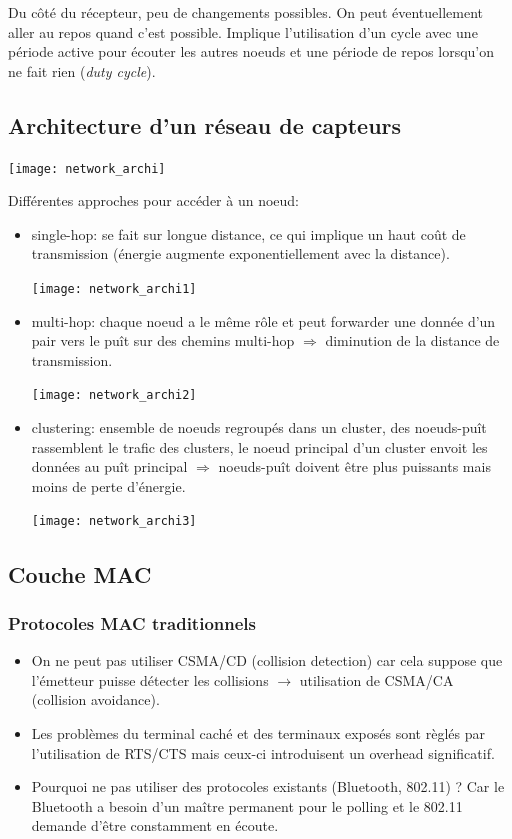 \documentclass{article}
\begin{document}
\begin{sffamily}
Du côté du récepteur, peu de changements possibles. On peut éventuellement
aller au repos quand c'est possible. Implique l'utilisation d'un cycle avec
une période active pour écouter les autres noeuds et une période de repos
lorsqu'on ne fait rien (\textit{duty cycle}).

\subsection{Architecture d'un réseau de capteurs}
\texttt{[image: network\_archi]}

Différentes approches pour accéder à un noeud:
\begin{itemize}
\item single-hop: se fait sur longue distance, ce qui implique un haut
  coût de transmission (énergie augmente exponentiellement avec la distance).

  \texttt{[image: network\_archi1]}
\item multi-hop: chaque noeud a le même rôle et peut forwarder une donnée
  d'un pair vers le puît sur des chemins multi-hop
  $\Rightarrow$ diminution de la distance de transmission.

  \texttt{[image: network\_archi2]}
\item clustering: ensemble de noeuds regroupés dans un cluster,
  des noeuds-puît rassemblent le trafic des clusters, le noeud principal
  d'un cluster envoit les données au puît principal
  $\Rightarrow$ noeuds-puît doivent être plus puissants
  mais moins de perte d'énergie.

  \texttt{[image: network\_archi3]}
\end{itemize}

\subsection{Couche MAC}
\subsubsection{Protocoles MAC traditionnels}
\begin{itemize}
\item On ne peut pas utiliser CSMA/CD (collision detection)
  car cela suppose que l'émetteur puisse détecter les collisions
  $\rightarrow$ utilisation de CSMA/CA (collision avoidance).
\item Les problèmes du terminal caché et des terminaux exposés sont règlés par
  l'utilisation de RTS/CTS mais ceux-ci introduisent un overhead significatif.
\item Pourquoi ne pas utiliser des protocoles existants (Bluetooth, 802.11) ?
  Car le Bluetooth a besoin d'un maître permanent pour le polling et
  le 802.11 demande d'être constamment en écoute.
\end{itemize}


\end{sffamily}
\end{document}
